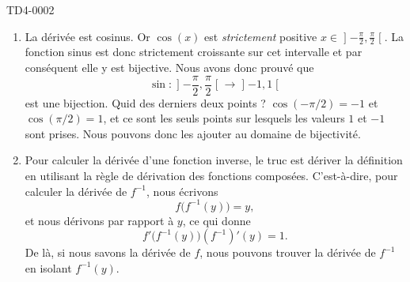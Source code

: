 
\begin{corrige}{TD4-0002}

	\begin{enumerate}
		\item
            La dérivée est cosinus. Or $\cos(x)$ est \emph{strictement} positive $x\in\mathopen] -\frac{ \pi }{2} , \frac{ \pi }{2} \mathclose[$. La fonction sinus est donc strictement croissante sur cet intervalle et par conséquent elle y est bijective. Nous avons donc prouvé que 
            \begin{equation}
                \sin\colon \mathopen] -\frac{ \pi }{2} , \frac{ \pi }{2} \mathclose[\to \mathopen] -1 , 1 \mathclose[ 
            \end{equation}
            est une bijection. Quid des derniers deux points ? \( \cos(-\pi/2)=-1\) et \( \cos(\pi/2)=1\), et ce sont les seuls points sur lesquels les valeurs \( 1\) et \( -1\) sont prises. Nous pouvons donc les ajouter au domaine de bijectivité.
		\item
			Pour calculer la dérivée d'une fonction inverse, le truc est dériver la définition en utilisant la règle de dérivation des fonctions composées. C'est-à-dire, pour calculer la dérivée de $f^{-1}$, nous écrivons
			\begin{equation}
				f\big( f^{-1}(y) \big)=y,
			\end{equation}
			et nous dérivons par rapport à $y$, ce qui donne
			\begin{equation}
				f'\big( f^{-1}(y) \big)(f^{-1})'(y)=1.
			\end{equation}
			De là, si nous savons la dérivée de $f$, nous pouvons trouver la dérivée de $f^{-1}$ en isolant $f^{-1}(y)$. 


\end{enumerate}
\end{corrige}
